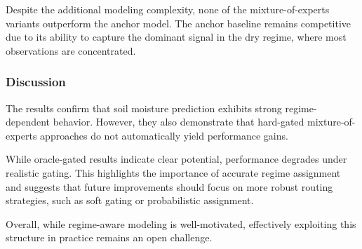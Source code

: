 Despite the additional modeling complexity, none of the mixture-of-experts variants outperform the anchor model. The anchor baseline remains competitive due to its ability to capture the dominant signal in the dry regime, where most observations are concentrated.

\subsubsection*{Discussion}
The results confirm that soil moisture prediction exhibits strong regime-dependent behavior. However, they also demonstrate that hard-gated mixture-of-experts approaches do not automatically yield performance gains.

While oracle-gated results indicate clear potential, performance degrades under realistic gating. This highlights the importance of accurate regime assignment and suggests that future improvements should focus on more robust routing strategies, such as soft gating or probabilistic assignment.

Overall, while regime-aware modeling is well-motivated, effectively exploiting this structure in practice remains an open challenge.
